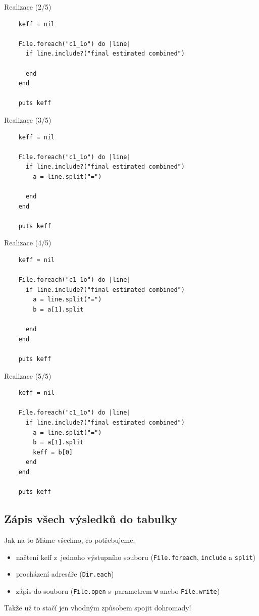 \documentclass{beamer}
\begin{document}
\begin{frame}[fragile]{Realizace (2/5)}
  \scriptsize
  \begin{verbatim}
    keff = nil

    File.foreach("c1_1o") do |line|
      if line.include?("final estimated combined")

      end
    end

    puts keff
  \end{verbatim}
\end{frame}

\begin{frame}[fragile]{Realizace (3/5)}
  \scriptsize
  \begin{verbatim}
    keff = nil

    File.foreach("c1_1o") do |line|
      if line.include?("final estimated combined")
        a = line.split("=")

      end
    end

    puts keff
  \end{verbatim}
\end{frame}

\begin{frame}[fragile]{Realizace (4/5)}
  \scriptsize
  \begin{verbatim}
    keff = nil

    File.foreach("c1_1o") do |line|
      if line.include?("final estimated combined")
        a = line.split("=")
        b = a[1].split

      end
    end

    puts keff
  \end{verbatim}
\end{frame}

\begin{frame}[fragile]{Realizace (5/5)}
  \scriptsize
  \begin{verbatim}
    keff = nil

    File.foreach("c1_1o") do |line|
      if line.include?("final estimated combined")
        a = line.split("=")
        b = a[1].split
        keff = b[0]
      end
    end

    puts keff
  \end{verbatim}
\end{frame}

\subsection{Zápis všech výsledků do tabulky}

\begin{frame}{Jak na to}
  Máme všechno, co potřebujeme:
  \begin{itemize}
    \item načtení keff z~jednoho výstupního souboru (\texttt{File.foreach}, \texttt{include} a \texttt{split})
    \item procházení adresáře (\texttt{Dir.each})
    \item zápis do souboru (\texttt{File.open} s~parametrem \texttt{w} anebo \texttt{File.write})
  \end{itemize}
  Takže už to stačí jen vhodným způsobem spojit dohromady!
\end{frame}
\end{document}
